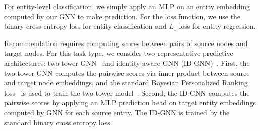For entity-level classification, we simply apply an MLP on an entity embedding computed by our GNN to make prediction. For the loss function, we use the binary cross entropy loss for entity classification and $L_1$ loss for entity regression.

Recommendation requires computing scores between pairs of source nodes and target nodes.
For this task type, we consider two representative predictive architectures: two-tower GNN~\citep{wang2019neural} and identity-aware GNN (ID-GNN)~\citep{you2021identity}. First, the two-tower GNN computes the pairwise scores via inner product between source and target node embeddings, and the standard Bayesian Personalized Ranking loss~\citep{rendle2012bpr} is used to train the two-tower model~\citep{wang2019neural}.
Second, the ID-GNN computes the pairwise scores by applying an MLP prediction head on target entity embeddings computed by GNN for each source entity. The ID-GNN is trained by the standard binary cross entropy loss.


